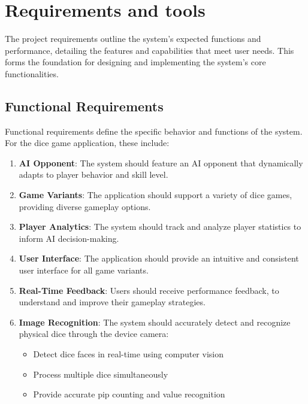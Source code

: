 
\chapter{Requirements and tools}

The project requirements outline the system's expected functions and performance, detailing the features and capabilities that meet user needs. This forms the foundation for designing and implementing the system's core functionalities.

\section{Functional Requirements}

Functional requirements define the specific behavior and functions of the system. For the dice game application, these include:
\begin{enumerate}
\item {\bfseries AI Opponent}: The system should feature an AI opponent that dynamically adapts to player behavior and skill level.
\item {\bfseries Game Variants}: The application should support a variety of dice games, providing diverse gameplay options.
\item {\bfseries Player Analytics}: The system should track and analyze player statistics to inform AI decision-making.
\item {\bfseries User Interface}: The application should provide an intuitive and consistent user interface for all game variants.
\item {\bfseries Real-Time Feedback}: Users should receive performance feedback, to understand and improve their gameplay strategies.
\item {\bfseries Image Recognition}: The system should accurately detect and recognize physical dice through the device camera:
    \begin{itemize}
        \item Detect dice faces in real-time using computer vision
        \item Process multiple dice simultaneously
        \item Provide accurate pip counting and value recognition
    \end{itemize}
\end{enumerate}
